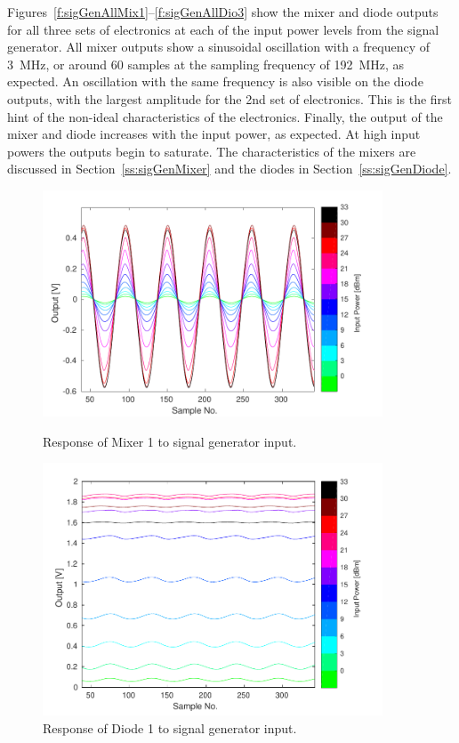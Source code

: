 Figures~\ref{f:sigGenAllMix1}--\ref{f:sigGenAllDio3} show the mixer and diode outputs for all three sets of electronics at each of the input power levels from the signal generator. 
All mixer outputs show a sinusoidal oscillation with a frequency of 3~MHz, or around 60 samples at the sampling frequency of 192~MHz, as expected. An oscillation with the same frequency is also visible on the diode outputs, with the largest amplitude for the 2nd set of electronics. This is the first hint of the non-ideal characteristics of the electronics. Finally, the output of the mixer and diode increases with the input power, as expected. At high input powers the outputs begin to saturate. 
The characteristics of the mixers are discussed in Section~\ref{ss:sigGenMixer} and the diodes in Section~\ref{ss:sigGenDiode}.

\begin{figure}
  \centering
  \includegraphics[width=0.9\textwidth]{Figures/phaseMons/Mixer1_AllPowerLevels}
  \caption{Response of Mixer 1 to signal generator input.}
  \label{f:sigGenAllMix1}
  \includegraphics[width=0.9\textwidth]{Figures/phaseMons/Diode1_AllPowerLevels}
  \caption{Response of Diode 1 to signal generator input.}
  \label{f:sigGenAllDio1}
\end{figure}

